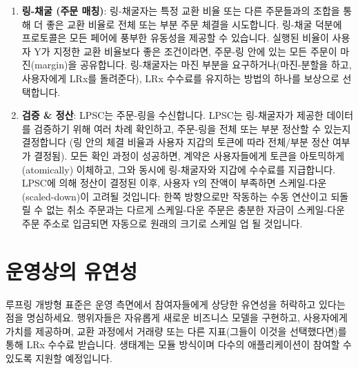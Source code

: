 \documentclass[UTF8,nofonts]{article}
\makeatletter
\newenvironment{figurehere}
 {\def\@captype{figure}}
 {}
\makeatother
\begin{document}
\begin{multicols}{2}
\begin{enumerate}
\begin{center}
\begin{figurehere}

\caption{루프링 교환 과정}
\label{fig:process}
\end{figurehere}
\end{center}



\item \textbf{링-채굴 (주문 매칭)}:  링-채굴자는 특정 교환 비율 또는 다른 주문들과의 조합을 통해 더 좋은 교환 비율로 전체 또는 부분 주문 체결을 시도합니다. 링-채굴 덕분에 프로토콜은 모든 페어에 풍부한 유동성을 제공할 수 있습니다. 실행된 비율이 사용자 Y가 지정한 교환 비율보다 좋은 조건이라면, 주문-링 안에 있는 모든 주문이 마진(margin)을 공유합니다. 링-채굴자는 마진 부분을 요구하거나(마진-분할을 하고, 사용자에게 LRx를 돌려준다), LRx 수수료를 유지하는 방법의 하나를 보상으로 선택합니다.

\item \textbf{검증 \& 정산}: 
LPSC는 주문-링을 수신합니다. LPSC는 링-채굴자가 제공한 데이터를 검증하기 위해 여러 차례 확인하고, 주문-링을 전체 또는 부분 정산할 수 있는지 결정합니다 (링 안의 체결 비율과 사용자 지갑의 토큰에 따라 전체/부분 정산 여부가 결정됨). 모든 확인 과정이 성공하면, 계약은 사용자들에게 토큰을 아토믹하게(atomically) 이체하고, 그와 동시에 링-채굴자와 지갑에 수수료를 지급합니다. LPSC에 의해 정산이 결정된 이후, 사용자 \verb|Y|의 잔액이 부족하면 스케일-다운(scaled-down)이 고려될 것입니다: 한쪽 방향으로만 작동하는 수동 연산이고 되돌릴 수 없는 취소 주문과는 다르게 스케일-다운 주문은 충분한 자금이 스케일-다운 주문 주소로 입금되면 자동으로 원래의 크기로 스케일 업 될 것입니다.

\end{enumerate}

\section{운영상의 유연성\label{sec:business_model}}
루프링 개방형 표준은 운영 측면에서 참여자들에게 상당한 유연성을 허락하고 있다는 점을 명심하세요. 행위자들은 자유롭게 새로운 비즈니스 모델을 구현하고, 사용자에게 가치를 제공하며, 교환 과정에서 거래량 또는 다른 지표(그들이 이것을 선택했다면)를 통해 LRx 수수료 받습니다. 생태계는 모듈 방식이며 다수의 애플리케이션이 참여할 수 있도록 지원할 예정입니다.      


\end{multicols}
\end{document}
